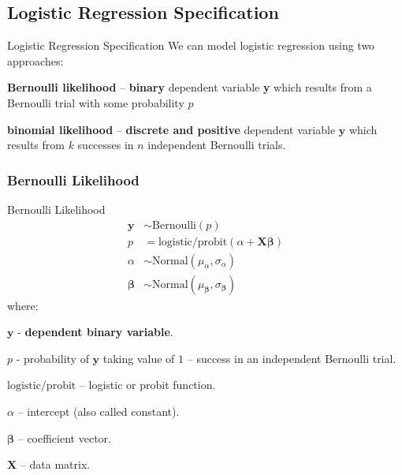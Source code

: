 \subsection{Logistic Regression Specification}
\begin{frame}{Logistic Regression Specification}
    We can model logistic regression using two approaches:
    \begin{vfilleditems}
        \item \textbf{Bernoulli likelihood} --
        \textbf{binary} dependent variable \textbf{y} which results from a
        Bernoulli trial with some probability $p$
        \item \textbf{binomial likelihood} --
        \textbf{discrete and positive} dependent variable $\textbf{y}$
        which results from $k$ successes in $n$ independent Bernoulli
        trials.
    \end{vfilleditems}
\end{frame}

\subsubsection{Bernoulli Likelihood}
\begin{frame}{Bernoulli Likelihood}
    \small
    $$
        \begin{aligned}
            \mathbf{y}         & \sim \text{Bernoulli}\left( p\right)                                      \\
            p                  & = \text{logistic/probit}(\alpha +  \mathbf{X} \boldsymbol{\beta})          \\
            \alpha             & \sim \text{Normal}(\mu_\alpha, \sigma_\alpha)                             \\
            \boldsymbol{\beta} & \sim \text{Normal}(\mu_{\boldsymbol{\beta}}, \sigma_{\boldsymbol{\beta}})
        \end{aligned}
    $$
    where:
    \begin{vfilleditems}
        \item \small $\mathbf{y}$ - \textbf{dependent binary variable}.
        \item \small $p$ - probability of $\mathbf{y}$ taking value of $1$ --
        success in an independent Bernoulli trial.
        \item \small $\text{logistic/probit}$ -- logistic or probit function.
        \item \small $\alpha$ -- intercept (also called constant).
        \item \small $\boldsymbol{\beta}$ -- coefficient vector.
        \item \small $\mathbf{X}$ -- data matrix.
    \end{vfilleditems}
\end{frame}

